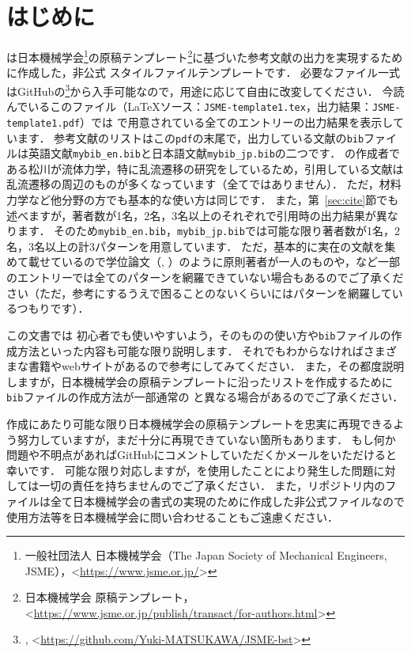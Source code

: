 \section{はじめに}
\label{sec:introduction}
\jsmefile は日本機械学会\footnote{一般社団法人 日本機械学会（The Japan Society of Mechanical Engineers, JSME），\textless\url{https://www.jsme.or.jp/}\textgreater}の原稿テンプレート\footnote{日本機械学会 原稿テンプレート，\textless\url{https://www.jsme.or.jp/publish/transact/for-authors.html}\textgreater}に基づいた参考文献の出力を実現するために作成した，非公式 \BibTeX スタイルファイルテンプレートです．
必要なファイル一式はGitHubの\JSMErepos\footnote{\JSMErepos, \textless\url{https://github.com/Yuki-MATSUKAWA/JSME-bst}\textgreater}から入手可能なので，用途に応じて自由に改変してください．
今読んでいるこのファイル（\LaTeX{}ソース：\verb|JSME-template1.tex|，出力結果：\verb|JSME-template1.pdf|）では \BibTeX で用意されている全てのエントリーの出力結果を表示しています．
参考文献のリストはこの\verb|pdf|の末尾で，出力している文献の\verb|bib|ファイルは英語文献\verb|mybib_en.bib|と日本語文献\verb|mybib_jp.bib|の二つです．
\JSMErepos の作成者である松川が流体力学，特に乱流遷移の研究をしているため，引用している文献は乱流遷移の周辺のものが多くなっています（全てではありません）．
ただ，材料力学など他分野の方でも基本的な使い方は同じです．
また，第~\ref{sec:cite}節でも述べますが，著者数が1名，2名，3名以上のそれぞれで引用時の出力結果が異なります．
そのため\verb|mybib_en.bib|，\verb|mybib_jp.bib|では可能な限り著者数が1名，2名，3名以上の計3パターンを用意しています．
ただ，基本的に実在の文献を集めて載せているので学位論文（\hyperref[ssec:phdthesis]{\ttphdthesis}, \hyperref[ssec:mastersthesis]{\ttmastersthesis}）のように原則著者が一人のものや\hyperref[ssec:manual]{\ttmanual}，\hyperref[ssec:unpublished]{\ttunpublished}など一部のエントリーでは全てのパターンを網羅できていない場合もあるのでご了承ください（ただ，参考にするうえで困ることのないくらいにはパターンを網羅しているつもりです）．

この文書では \BibTeX 初心者でも使いやすいよう，\BibTeX そのものの使い方や\verb|bib|ファイルの作成方法といった内容も可能な限り説明します．
それでもわからなければさまざまな書籍やwebサイトがあるので参考にしてみてください．
また，その都度説明しますが，日本機械学会の原稿テンプレートに沿ったリストを作成するために\verb|bib|ファイルの作成方法が一部通常の \BibTeX と異なる場合があるのでご了承ください．

\JSMErepos 作成にあたり可能な限り日本機械学会の原稿テンプレートを忠実に再現できるよう努力していますが，まだ十分に再現できていない箇所もあります．
もし何か問題や不明点があればGitHubにコメントしていただくかメールをいただけると幸いです．
可能な限り対応しますが，\JSMErepos を使用したことにより発生した問題に対しては一切の責任を持ちませんのでご了承ください．
また，\JSMErepos リポジトリ内のファイルは全て日本機械学会の書式の実現のために作成した非公式ファイルなので使用方法等を日本機械学会に問い合わせることもご遠慮ください．
